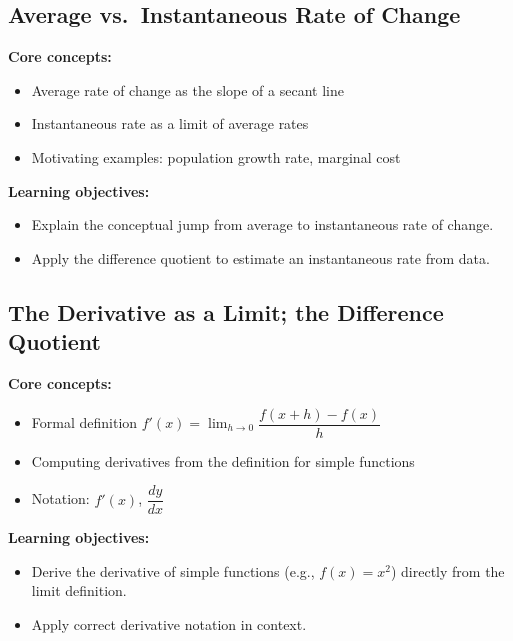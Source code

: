 \documentclass{article}
\begin{document}
\subsection{Average vs.\ Instantaneous Rate of Change}
\textbf{Core concepts:}
\begin{itemize}[leftmargin=*]
  \item Average rate of change as the slope of a secant line
  \item Instantaneous rate as a limit of average rates
  \item Motivating examples: population growth rate, marginal cost
\end{itemize}
\textbf{Learning objectives:}
\begin{itemize}[leftmargin=*]
  \item Explain the conceptual jump from average to instantaneous rate of change.
  \item Apply the difference quotient to estimate an instantaneous rate from data.
\end{itemize}

\subsection{The Derivative as a Limit; the Difference Quotient}
\textbf{Core concepts:}
\begin{itemize}[leftmargin=*]
  \item Formal definition $f'(x) = \lim_{h \to 0} \dfrac{f(x+h)-f(x)}{h}$
  \item Computing derivatives from the definition for simple functions
  \item Notation: $f'(x)$, $\dfrac{dy}{dx}$
\end{itemize}
\textbf{Learning objectives:}
\begin{itemize}[leftmargin=*]
  \item Derive the derivative of simple functions (e.g., $f(x)=x^2$) directly from the limit definition.
  \item Apply correct derivative notation in context.
\end{itemize}
\end{document}
